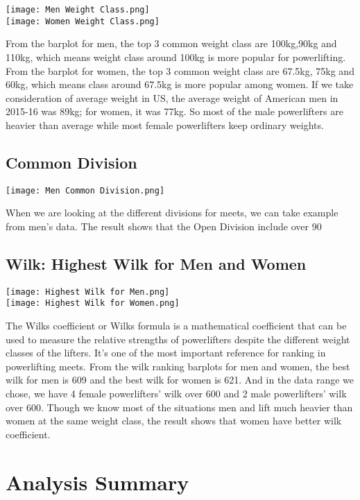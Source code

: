 \documentclass{article}
\begin{document}
\texttt{[image: Men Weight Class.png]}\\
\texttt{[image: Women Weight Class.png]}

From the barplot for men, the top 3 common weight class are 100kg,90kg and 110kg, which means weight class around 100kg is more popular for powerlifting. From the barplot for women, the top 3 common weight class are 67.5kg, 75kg and 60kg, which means class around 67.5kg is more popular among women. 
If we take consideration of average weight in US, the average weight of American men in 2015-16 was 89kg; for women, it was 77kg. So most of the male powerlifters are heavier than average while most female powerlifters keep ordinary weights.

\subsection{Common Division}

\texttt{[image: Men Common Division.png]}

When we are looking at the different divisions for meets, we can take example from men's data. The result shows that the Open Division include over 90%

\subsection{Wilk: Highest Wilk for Men and Women}

\texttt{[image: Highest Wilk for Men.png]}\\
\texttt{[image: Highest Wilk for Women.png]}

The Wilks coefficient or Wilks formula is a mathematical coefficient that can be used to measure the relative strengths of powerlifters despite the different weight classes of the lifters. It's one of the most important reference for ranking in powerlifting meets. From the wilk ranking barplots for men and women, the best wilk for men is 609 and the best wilk for women is 621. And in the data range we chose, we have 4 female powerlifters' wilk over 600 and 2 male powerlifters' wilk over 600.
Though we know most of the situations men and lift much heavier than women at the same weight class, the result shows that women have better wilk coefficient.



\section{Analysis Summary}
\end{document}
